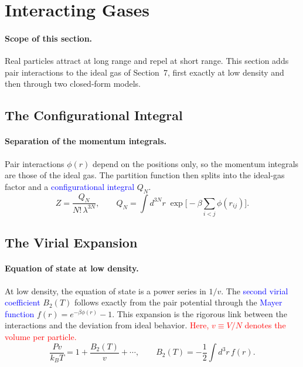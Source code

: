 
\section{Interacting Gases}

\paragraph{Scope of this section.}
Real particles attract at long range and repel at short range. This section
adds pair interactions to the ideal gas of Section~7, first exactly at low
density and then through two closed-form models.

\subsection{The Configurational Integral}

\paragraph{Separation of the momentum integrals.}
Pair interactions $\phi(r)$ depend on the positions only, so the momentum
integrals are those of the ideal gas. The partition function then splits
into the ideal-gas factor and a \textcolor{blue}{configurational integral}
$Q_N$.
\begin{equation}
    \boxed{Z=\frac{Q_N}{N!\,\lambda^{3N}},\qquad
    Q_N=\int d^{3N}r\;\exp\!\Big[-\beta\sum_{i<j}\phi(r_{ij})\Big].}
\end{equation}

\subsection{The Virial Expansion}

\paragraph{Equation of state at low density.}
At low density, the equation of state is a power series in $1/v$. The
\textcolor{blue}{second virial coefficient} $B_2(T)$ follows exactly from
the pair potential through the \textcolor{blue}{Mayer function}
$f(r)=e^{-\beta\phi(r)}-1$. This expansion is the rigorous link between the
interactions and the deviation from ideal behavior.
\textcolor{red}{Here, $v\equiv V/N$ denotes the volume per particle.}
\begin{equation}
    \boxed{\frac{Pv}{k_BT}=1+\frac{B_2(T)}{v}+\cdots,\qquad
    B_2(T)=-\frac{1}{2}\int d^3r\,f(r).}
\end{equation}


